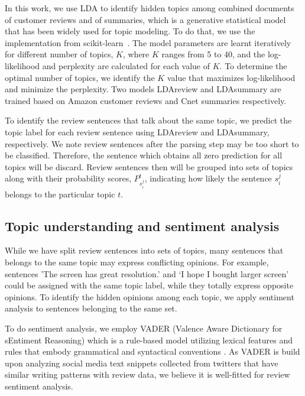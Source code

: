 \documentclass[letterpaper]{article}
\begin{document}
In this work, we use LDA to identify hidden topics among combined documents of customer reviews and of summaries, which is a generative statistical model that has been widely used for topic modeling. To do that, we use the implementation from scikit-learn~\cite{Hoffman2010Online}. The model parameters are learnt iteratively for different number of topics, $K$, where $K$ ranges from 5 to 40, and the log-likelihood and perplexity are calculated for each value of $K$. To determine the optimal number of topics, we identify the $K$ value that maximizes log-likelihood and minimize the perplexity. Two models LDAreview and LDAsummary are trained based on Amazon customer reviews and Cnet summaries respectively.

To identify the review sentences that talk about the same topic, we predict the topic label for each review sentence using LDAreview and LDAsummary, respectively. We note review sentences after the parsing step may be too short to be classified. Therefore, the sentence which obtains all zero prediction for all topics will be discard. 
Review sentences then will be grouped into sets of topics along with their probability scores, $P_{s_i^j}^t$, indicating how likely the sentence $s_i^j$ belongs to the particular topic $t$.

\subsection{Topic understanding and sentiment analysis}
While we have split review sentences into sets of topics, many sentences that belongs to the same topic may express conflicting opinions. For example, sentences ’The screen has great resolution.’ and ‘I hope I bought larger screen’ could be assigned with the same topic label, while they totally express opposite opinions. To identify the hidden opinions among each topic, we apply sentiment analysis to sentences belonging to the same set.

To do sentiment analysis, we employ VADER (Valence Aware Dictionary for sEntiment Reasoning) which is a rule-based model utilizing lexical features and rules that embody grammatical and syntactical conventions \cite{Hutto2014Vader}. As VADER is build upon analyzing social media text snippets collected from twitters that have similar writing patterns with review data, we believe it is well-fitted for review sentiment analysis.
\end{document}
